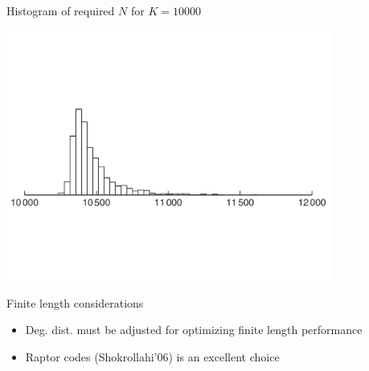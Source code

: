 \documentclass[10pt,xcolor=table]{beamer}
\begin{document}
\begin{frame}{Histogram of required $N$ for $K=10000$}
\begin{center}
  \includegraphics[width=4.2in]{./Figures/fountaincodes10000histogram}
\end{center}
\begin{block}{Finite length considerations}
\begin{itemize}
  \item Deg. dist. must be adjusted for optimizing finite length performance
  \item Raptor codes (Shokrollahi'06) is an excellent choice
\end{itemize}
\end{block}
\end{frame}
\end{document}
